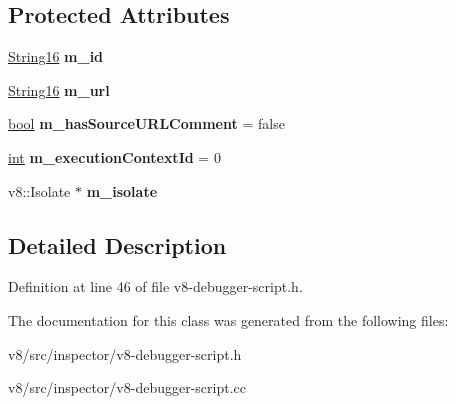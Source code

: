 \subsection*{Protected Attributes}
\begin{DoxyCompactItemize}
\item 
\mbox{\label{classv8__inspector_1_1V8DebuggerScript_ad4a2821b58914ffba8f730310f263fc7}} 
\mbox{\hyperlink{classv8__inspector_1_1String16}{String16}} {\bfseries m\+\_\+id}
\item 
\mbox{\label{classv8__inspector_1_1V8DebuggerScript_af82dc216034a744dcb7f4fd12ffd7b92}} 
\mbox{\hyperlink{classv8__inspector_1_1String16}{String16}} {\bfseries m\+\_\+url}
\item 
\mbox{\label{classv8__inspector_1_1V8DebuggerScript_adddcd02a09aee3891aa6ff714e162da7}} 
\mbox{\hyperlink{classbool}{bool}} {\bfseries m\+\_\+has\+Source\+U\+R\+L\+Comment} = false
\item 
\mbox{\label{classv8__inspector_1_1V8DebuggerScript_a107b4449749bc60fd7833ecdbd430f7b}} 
\mbox{\hyperlink{classint}{int}} {\bfseries m\+\_\+execution\+Context\+Id} = 0
\item 
\mbox{\label{classv8__inspector_1_1V8DebuggerScript_a1506ffe2c9030e890470c10b9ce1589e}} 
v8\+::\+Isolate $\ast$ {\bfseries m\+\_\+isolate}
\end{DoxyCompactItemize}


\subsection{Detailed Description}


Definition at line 46 of file v8-\/debugger-\/script.\+h.



The documentation for this class was generated from the following files\+:\begin{DoxyCompactItemize}
\item 
v8/src/inspector/v8-\/debugger-\/script.\+h\item 
v8/src/inspector/v8-\/debugger-\/script.\+cc\end{DoxyCompactItemize}
